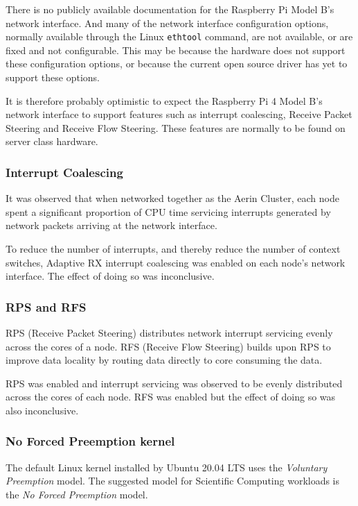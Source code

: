 There is no publicly available documentation for the Raspberry Pi Model B's network interface. And many of the network interface configuration options, normally available through the Linux \verb|ethtool| command, are not available, or are fixed and not configurable. This may be because the hardware does not support these configuration options, or because the current open source driver has yet to support these options.

It is therefore probably optimistic to expect the Raspberry Pi 4 Model B's network interface to support features such as interrupt coalescing, Receive Packet Steering and Receive Flow Steering. These features are normally to be found on server class hardware.

  


\subsubsection{Interrupt Coalescing}

It was observed that when networked together as the Aerin Cluster, each node spent a significant proportion of CPU time servicing interrupts generated by network packets arriving at the network interface.

To reduce the number of interrupts, and thereby reduce the number of context switches, Adaptive RX interrupt coalescing was enabled on each node's network interface. The effect of doing so was inconclusive. 


\subsubsection{RPS and RFS}

RPS (Receive Packet Steering) distributes network interrupt servicing evenly across the cores of a node. RFS (Receive Flow Steering) builds upon RPS to improve data locality by routing data directly to core consuming the data.

RPS was enabled and interrupt servicing was observed to be evenly distributed across the cores of each node. RFS was enabled but the effect of doing so was also inconclusive.


\subsubsection{No Forced Preemption kernel}

The default Linux kernel installed by Ubuntu 20.04 LTS uses the \emph{Voluntary Preemption} model. The suggested model for Scientific Computing workloads is the \emph{No Forced Preemption} model.

